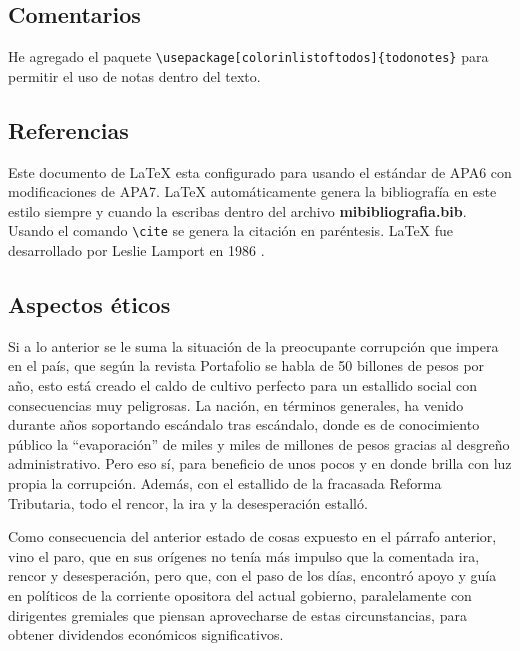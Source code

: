 \documentclass[doc, 12pt, letterpaper, donotrepeattitle, floatsintext, apacite]{apa6}    %
\newcommand{\latex}{\LaTeX\xspace}  %
\begin{document}
\subsection{Comentarios} 
He agregado el paquete \verb|\usepackage[colorinlistoftodos]{todonotes}| para permitir el uso de notas dentro del texto.


\subsection{Referencias} 
Este documento de \latex esta configurado para usando el estándar de APA6 con modificaciones de APA7. \latex automáticamente genera la bibliografía en este estilo siempre y cuando la escribas dentro del archivo \textbf{mibibliografia.bib}. Usando el comando \verb|\cite| se genera la citación en paréntesis. \latex fue desarrollado por Leslie Lamport en 1986 \cite{lamport1986}.

\subsection{Aspectos éticos}
Si a lo anterior se le suma la situación de la preocupante corrupción que impera en el país, que según la revista Portafolio se habla de 50 billones de pesos por año, esto está creado el caldo de cultivo perfecto para un estallido social con consecuencias muy peligrosas. La nación, en términos generales, ha venido durante años soportando escándalo tras escándalo, donde es de conocimiento público la “evaporación” de miles y miles de millones de pesos gracias al desgreño administrativo. Pero eso sí, para beneficio de unos pocos y en donde brilla con luz propia la corrupción. Además, con el estallido de la fracasada Reforma Tributaria, todo el rencor, la ira y la desesperación estalló.

Como consecuencia del anterior estado de cosas expuesto en el párrafo anterior, vino el paro, que en sus orígenes no tenía más impulso que la comentada ira, rencor y desesperación, pero que, con el paso de los días, encontró apoyo y guía en políticos de la corriente opositora del actual gobierno, paralelamente con dirigentes gremiales que piensan aprovecharse de estas circunstancias, para obtener dividendos económicos significativos.
\end{document}
